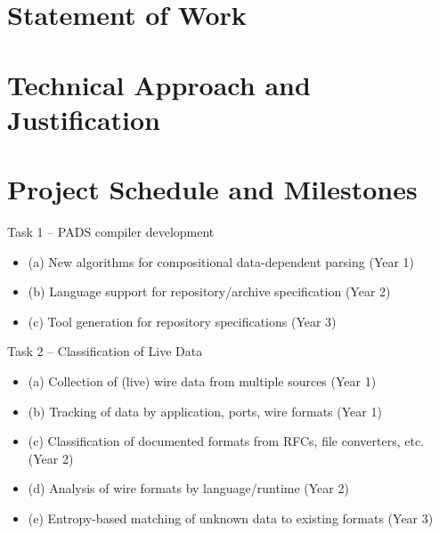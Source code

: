 \documentclass[12pt]{article}
\begin{document}
\section{Statement of Work}



\newpage

\section{Technical Approach and Justification}











%

%

%

%

%



\newpage
\section{Project Schedule and Milestones}

Task 1 -- PADS compiler development
\begin{itemize}
\item (a) New algorithms for compositional data-dependent parsing (Year 1)
\item (b) Language support for repository/archive specification (Year 2)
\item (c) Tool generation for repository specifications (Year 3)
\end{itemize}

Task 2 -- Classification of Live Data
\begin{itemize}
\item (a) Collection of (live) wire data from multiple sources (Year 1)
\item (b) Tracking of data by application, ports, wire formats (Year 1)
\item (c) Classification of documented formats from RFCs, file converters, etc. (Year 2)
\item (d) Analysis of wire formats by language/runtime (Year 2)
\item (e) Entropy-based matching of unknown data to existing formats (Year 3)
\end{itemize}
\end{document}
